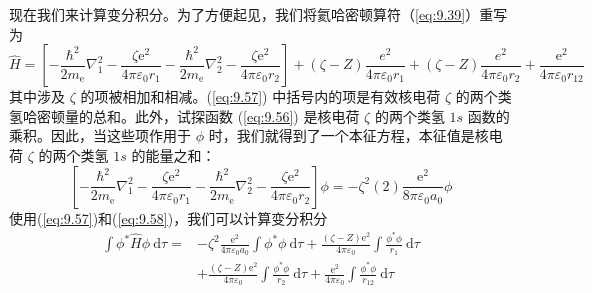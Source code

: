     现在我们来计算变分积分。为了方便起见，我们将氦哈密顿算符（\ref{eq:9.39}）重写为
    \begin{equation}
        \hat{H} = \left[-\frac{\hbar^2}{2m_{\mathrm{e}}}\nabla_1^2 - \frac{\zeta\mathrm{e}^2}{4\pi\varepsilon_0r_1} - \frac{\hbar^2}{2m_{\mathrm{e}}}\nabla_2^2 - \frac{\zeta\mathrm{e}^2}{4\pi\varepsilon_0r_2} \right] + \left(\zeta - Z\right)\frac{e^2}{4\pi\varepsilon_0r_{1}} + \left(\zeta - Z\right)\frac{e^2}{4\pi\varepsilon_0r_{2}} + \frac{\mathrm{e}^2}{4\pi\varepsilon_0r_{12}}
        \label{eq:9.57}
    \end{equation}
    其中涉及 $\zeta$ 的项被相加和相减。(\ref{eq:9.57}) 中括号内的项是有效核电荷 $\zeta$ 的两个类氢哈密顿量的总和。此外，试探函数 (\ref{eq:9.56}) 是核电荷 $\zeta$ 的两个类氢 $1s$ 函数的乘积。因此，当这些项作用于 $\phi$ 时，我们就得到了一个本征方程，本征值是核电荷 $\zeta$ 的两个类氢 $1s$ 的能量之和：
    \begin{equation}
        \left[-\frac{\hbar^2}{2m_{\mathrm{e}}}\nabla_1^2 - \frac{\zeta\mathrm{e}^2}{4\pi\varepsilon_0r_1} - \frac{\hbar^2}{2m_{\mathrm{e}}}\nabla_2^2 - \frac{\zeta\mathrm{e}^2}{4\pi\varepsilon_0r_2} \right] \phi = -\zeta^2\left(2\right)\frac{\mathrm{e}^2}{8\pi\varepsilon_0a_0}\phi
        \label{eq:9.58}
    \end{equation}
    使用(\ref{eq:9.57})和(\ref{eq:9.58})，我们可以计算变分积分
    \begin{equation}
        \begin{aligned}
            \int \phi^* \hat{H} \phi \:\mathrm{d}\tau = &-\zeta^2\frac{\mathrm{e}^2}{4\pi\varepsilon_0a_0} \int \phi^* \phi \:\mathrm{d}\tau + \frac{\left(\zeta - Z\right)\mathrm{e}^2}{4\pi\varepsilon_0} \int \frac{\phi^*\phi}{r_1} \:\mathrm{d}\tau \\
            &+ \frac{\left(\zeta - Z\right)\mathrm{e}^2}{4\pi\varepsilon_0} \int \frac{\phi^*\phi}{r_2} \:\mathrm{d}\tau + \frac{\mathrm{e}^2}{4\pi\varepsilon_0}\int \frac{\phi^*\phi}{r_{12}} \:\mathrm{d}\tau
        \end{aligned}
        \label{eq:9.59}
    \end{equation}

